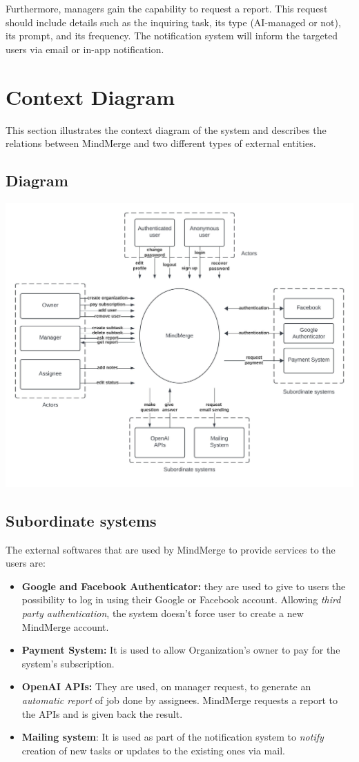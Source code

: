 \documentclass{article}
\begin{document}
Furthermore, managers gain the capability to request a report. This request should include details such as the inquiring task, its type (AI-managed or not), its prompt, and its frequency. The notification system will inform the targeted users via email or in-app notification.

\section{Context Diagram}
This section illustrates the context diagram of the system and describes the relations between MindMerge and two different types of external entities.

\subsection{Diagram}
\includegraphics[width=\textwidth, height=\textheight, keepaspectratio]{images/context_diagram.jpeg}

\subsection{Subordinate systems}
The external softwares that are used by MindMerge to provide services to the users are:
\begin{itemize}
    \item \textbf{Google and Facebook Authenticator:} they are used to give to users the possibility to log in using their Google or Facebook account. Allowing \textit{third party authentication}, the system doesn't force user to create a new MindMerge account.
    \item \textbf{Payment System:} It is used to allow Organization's owner to pay for the system's subscription.
    \item \textbf{OpenAI APIs:} They are used, on manager request, to generate an \textit{automatic report} of job done by assignees. MindMerge requests a report to the APIs and is given back the result.
    \item \textbf{Mailing system}: It is used as part of the notification system to \textit{notify} creation of new tasks or updates to the existing ones via mail.
\end{itemize}
\end{document}

